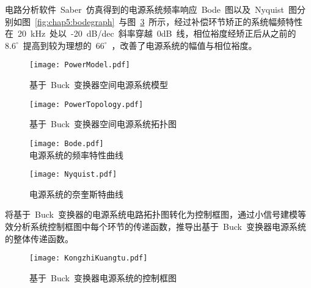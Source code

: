 电路分析软件~Saber~仿真得到的电源系统频率响应~Bode~图以及~Nyquist~图分别如图~\ref{fig:chap5:bodegraph}~与图~\ref{fig:chap5:nyquist}~所示，经过补偿环节矫正的系统幅频特性在~20~kHz~处以~-20~dB/dec~斜率穿越~0dB~线，相位裕度经矫正后从之前的~$8.6^\circ$~提高到较为理想的~$66^\circ$~，改善了电源系统的幅值与相位裕度。

\begin{figure}[h]
  \centering
     \texttt{[image: PowerModel.pdf]}\\
  \caption{基于~Buck~变换器空间电源系统模型}\label{fig:chap5:powermodel}
\end{figure}

\begin{figure}[h]
  \centering
     \texttt{[image: PowerTopology.pdf]}\\
  \caption{基于~Buck~变换器空间电源系统拓扑图}\label{fig:chap5:powertopology}
\end{figure}
\iffalse
\begin{figure}[h]
  \centering
     \texttt{[image: BuckCloseloop.pdf]}\\
  \caption{基于~Buck~变换器空间电源系统~Saber~仿真图}\label{fig:chap5:buckcloseloop}
\end{figure}
\fi
\begin{figure}[h]
\begin{minipage}[t]{0.5\linewidth}
  \centering
  \texttt{[image: Bode.pdf]}\\
  \caption{电源系统的频率特性曲线}\label{fig:chap5:bodegraph}
\end{minipage}
\begin{minipage}[t]{0.5\linewidth}
  \centering
  \texttt{[image: Nyquist.pdf]}\\
  \caption{电源系统的奈奎斯特曲线}\label{fig:chap5:nyquist}
\end{minipage}
\end{figure}

\newpage
将基于~Buck~变换器的电源系统电路拓扑图转化为控制框图，通过小信号建模等效分析系统控制框图中每个环节的传递函数，推导出基于~Buck~变换器电源系统的整体传递函数。
\begin{figure}[h]
  \centering
     \texttt{[image: KongzhiKuangtu.pdf]}\\
  \caption{基于~Buck~变换器电源系统的控制框图}\label{fig:chap5:kongzhikuangtu}
\end{figure}

